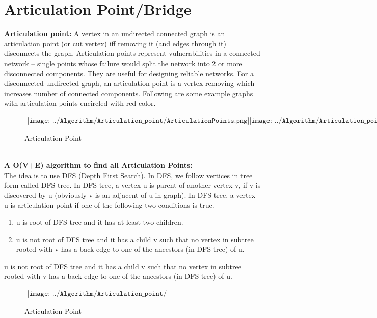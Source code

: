 \documentclass[11pt]{report}
\begin{document}
\section{Articulation Point/Bridge}
\textbf{Articulation point:}
A vertex in an undirected connected graph is an articulation point (or cut vertex) iff removing it (and edges through it) disconnects the graph. Articulation points represent vulnerabilities in a connected network – single points whose failure would split the network into 2 or more disconnected components. They are useful for designing reliable networks.
For a disconnected undirected graph, an articulation point is a vertex removing which increases number of connected components.
Following are some example graphs with articulation points encircled with red color.
\begin{figure}[h]
\begin{center}$
\begin{array}{cc}
\texttt{[image: ../Algorithm/Articulation\_point/ArticulationPoints.png]}
\texttt{[image: ../Algorithm/Articulation\_point/ArticulationPoints1.png]}
\texttt{[image: ../Algorithm/Articulation\_point/ArticulationPoints21.png]}
\end{array}$
\end{center}
\caption{Articulation Point}
\end{figure}\\
\textbf{A O(V+E) algorithm to find all Articulation Points: } \\
The idea is to use DFS (Depth First Search). In DFS, we follow vertices in tree form called DFS tree. In DFS tree, a vertex u is parent of another vertex v, if v is discovered by u (obviously v is an adjacent of u in graph). In DFS tree, a vertex u is articulation point if one of the following two conditions is true.
\begin{enumerate}
\item u is root of DFS tree and it has at least two children.
\item  u is not root of DFS tree and it has a child v such that no vertex in subtree rooted with v has a back edge to one of the ancestors (in DFS tree) of u.
\end{enumerate}
 u is not root of DFS tree and it has a child v such that no vertex in subtree rooted with v has a back edge to one of the ancestors (in DFS tree) of u.
 \begin{figure}[h]
\begin{center}$
\begin{array}{cc}
\texttt{[image: ../Algorithm/Articulation\_point/ArticulationPoints4.png]}
\end{array}$
\end{center}
\caption{Articulation Point}
\end{figure}\\
\end{document}
